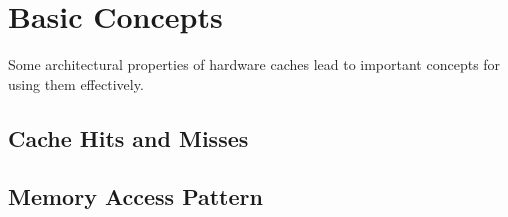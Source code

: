 \section{Basic Concepts}
Some architectural properties of hardware caches lead to important concepts for using them
effectively.




\subsection{Cache Hits and Misses}


\subsection{Memory Access Pattern}
\label{sec:map}

